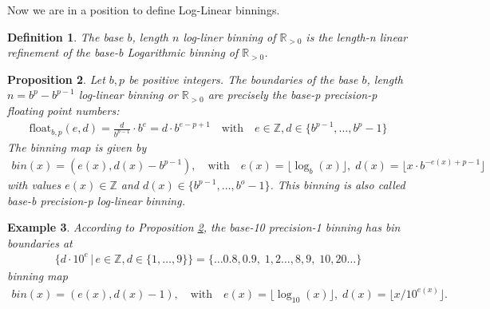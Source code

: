 \documentclass{article}
\theoremstyle{plain}
\newtheorem{definition}{Definition}[section]
\newtheorem{proposition}[definition]{Proposition}
\newtheorem{example}[definition]{Example}
\theoremstyle{remark}
\newcommand{\IR}{\mathbb{R}}
\newcommand{\IZ}{\mathbb{Z}}
\newcommand{\qtext}[1]{\quad\text{#1}\quad} %
\newcommand{\floor}[1]{\lfloor#1\rfloor}
\newcommand{\float}{\mathrm{float}}
\begin{document}
Now we are in a position to define Log-Linear binnings.

\begin{definition}
  The base $b$, length $n$ log-liner binning of $\IR_{>0}$ is the length-n linear refinement of the base-b Logarithmic binning of $\IR_{>0}$.
\end{definition}

\begin{proposition}\label{prop:ll}
  Let $b,p$ be positive integers. The boundaries of the base $b$, length $n = b^p - b^{p-1}$ log-linear
  binning or $\IR_{>0}$ are precisely the base-p precision-p floating point numbers:
  \begin{align*}
    \float_{b,p}(e, d) = \frac{d}{b^{p-1}} \cdot b^e = d \cdot b^{e-p+1} \qtext{with} e \in \IZ, d \in \{ b^{p-1}, \dots, b^p - 1 \}
  \end{align*}
  The binning map is given by
  \begin{align*}
    bin(x) = (e(x), d(x) - b^{p-1}), \qtext{with} e(x) = \floor{\log_b(x)},\; d(x) = \floor{x \cdot b^{-e(x) + p - 1}}
  \end{align*}
  with values $e(x) \in \IZ$ and $d(x) \in \{b^{p-1}, \dots, b^{o} - 1\}$.
  This binning is also called base-b precision-p log-linear binning.
\end{proposition}

\begin{example}
  According to Proposition \ref{prop:ll}, the base-10 precision-1 binning has bin boundaries at
  \begin{align*}
      \{ d \cdot 10^e  \,|\, e \in \IZ, d \in \{ 1, \dots, 9 \} \} = \{ \dots 0.8, 0.9,\; 1, 2 \dots, 8, 9,\; 10, 20 \dots \}
  \end{align*}
  binning map
  \begin{align*}
    bin(x) = (e(x), d(x) - 1), \qtext{with} e(x) = \floor{\log_{10}(x)},\; d(x) = \floor{x / 10^{e(x)}}.
  \end{align*}
\end{example}
\end{document}
